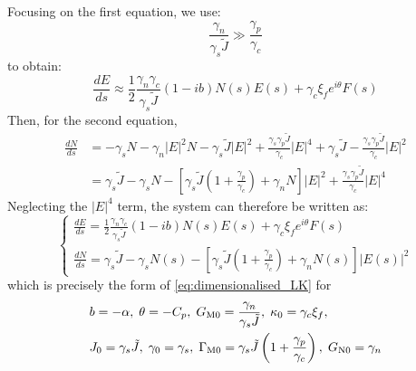 Focusing on the first equation, we use:
%
\begin{equation*}
    \frac{\gamma_{n}}{\gamma_{s} \tilde{J}} \gg \frac{\gamma_{p}}{\gamma_{c}}
\end{equation*}
%
to obtain:
%
\begin{equation*}
    \frac{d E}{d s} \approx \frac{1}{2} \frac{\gamma_n \gamma_c}{\gamma_{s} \tilde{J}}(1-ib) N(s) E(s)+ \gamma_c \xi_{f} e^{i\theta} F(s)
\end{equation*}
%
Then, for the second equation,
%
\begin{align*}
\displaystyle \frac{d N}{d s} &= -\gamma_s N - \gamma_n|E|^{2} N - \gamma_s \tilde{J}|E|^2 + \frac{\gamma_s \gamma_p \tilde{J}} {\gamma_{c}}|E|^{4} + \gamma_{s} \tilde{J} - \frac{\gamma_{s} \gamma_{p} \tilde{J}}{\gamma_{c}}|E|^{2}\\
&=\gamma_{s} \tilde{J}-\gamma_{s} N-\left[\gamma_{s} \tilde{J}\left(1+\frac{\gamma_{p}}{\gamma_{c}}\right)+\gamma_{n} N\right]|E|^{2}+\frac{\gamma_{s} \gamma_{p} \tilde{J}}{\gamma_{c}}|E|^{4}
\end{align*}
%
Neglecting the $|E|^{4}$ term, the system can therefore be written as:
%
\begin{equation*}
\left\{\begin{array}{l}
\displaystyle \frac{d E}{d s}=\frac{1}{2} \frac{\gamma_{n}\gamma_c}{\gamma_{s} \tilde{J}}(1-ib) N(s) E(s)+\gamma_c\xi_{f} e^{i\theta} F(s) \\ 
\displaystyle \frac{d N}{d s}=\gamma_{s} \tilde{J}-\gamma_{s} N(s)-\left[\gamma_{s} \tilde{J}\left(1+\frac{\gamma_{p}}{\gamma_{c}}\right)+\gamma_{n} N(s)\right]|E(s)|^{2}\end{array}\right.
\end{equation*}
%
which is precisely the form of \eqref{eq:dimensionalised_LK} for
%
$$
\begin{aligned}
& b = -\alpha, \; \theta=-C_{p}, \; G_\text{M0}=\frac{\gamma_{n}}{\gamma_{s} \tilde{J}}, \; \kappa_{0}=\gamma_{c} \xi_{f}, \\
& J_{0}=\gamma_{s} \tilde{J}, \; \gamma_{0}=\gamma_{s}, \; \Gamma_\text{M0}=\gamma_{s} \tilde{J}\left(1+\frac{\gamma_{p}}{\gamma_{c}}\right), \; G_\text{N0}=\gamma_{n}
\end{aligned}
$$
%
%
